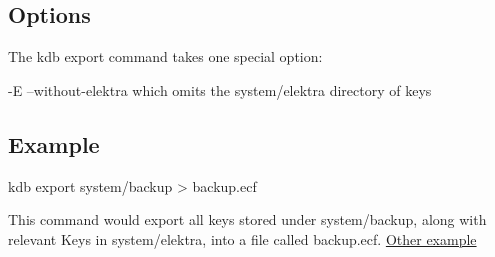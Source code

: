 \subsection*{Options}

The kdb export command takes one special option\+: \begin{DoxyVerb}    -E --without-elektra                    which omits the system/elektra directory of keys
\end{DoxyVerb}


\subsection*{Example}

\begin{DoxyVerb}    kdb export system/backup > backup.ecf
\end{DoxyVerb}


This command would export all keys stored under system/backup, along with relevant Keys in system/elektra, into a file called backup.\+ecf. \hyperlink{doc_tutorials_export-dump_md}{Other example} 